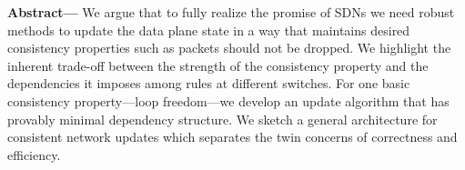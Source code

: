 \textbf{Abstract---}
We argue that to fully realize the promise of SDNs we need robust methods to update the data plane state in a way that maintains desired consistency properties such as packets should not be dropped. We highlight the inherent trade-off between the strength of the consistency property and the dependencies it imposes among rules at different switches.
For one basic consistency property---loop freedom---we develop an update algorithm that has provably minimal dependency structure.
We sketch a general architecture for consistent network updates which separates the twin concerns of correctness and efficiency. 
